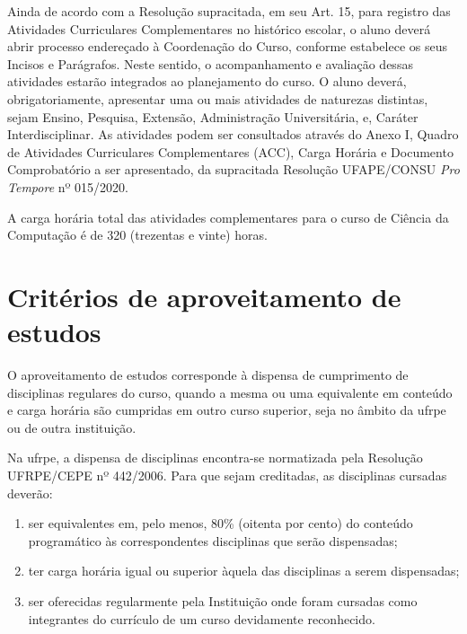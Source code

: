 \documentclass[
	12pt,				%
	openright,			%
  oneside,     %
	a4paper,			%
 hyphens,
	chapter=TITLE,		%
	english,			%
	french,				%
	spanish,			%
	brazil				%
	]{abntex2}
\begin{document}
Ainda de acordo com a Resolução supracitada, em seu Art. 15, para registro das Atividades Curriculares Complementares no histórico escolar, o aluno deverá abrir processo endereçado à Coordenação do Curso, conforme estabelece os seus Incisos e Parágrafos. Neste sentido, o acompanhamento e avaliação dessas atividades estarão integrados ao planejamento do curso. O aluno deverá, obrigatoriamente, apresentar uma ou mais atividades de naturezas distintas, sejam Ensino, Pesquisa, Extensão, Administração Universitária, e, Caráter Interdisciplinar. As atividades podem ser consultados através do Anexo I, Quadro de Atividades Curriculares Complementares (ACC), Carga Horária e Documento Comprobatório a ser apresentado, da supracitada Resolução UFAPE/CONSU \textit{Pro Tempore} nº 015/2020.

A carga horária total das atividades complementares para o curso de Ciência da Computação é de 320 (trezentas e vinte) horas.



%
%


\chapter{Critérios de aproveitamento de estudos}

O aproveitamento de estudos corresponde à dispensa de cumprimento de disciplinas regulares do curso, quando a mesma ou uma equivalente em conteúdo e carga horária são cumpridas em outro curso superior, seja no âmbito da \acrshort{ufrpe} ou de outra instituição.

Na \acrshort{ufrpe}, a dispensa de disciplinas encontra-se normatizada pela Resolução UFRPE/CEPE nº 442/2006. Para que sejam creditadas, as disciplinas cursadas deverão:

\begin{enumerate}[label=(\alph*)]
  \item ser equivalentes em, pelo menos, 80\% (oitenta por cento) do conteúdo programático às correspondentes disciplinas que serão dispensadas; 	
  \item ter carga horária igual ou superior àquela das disciplinas a serem dispensadas; 	
  \item ser oferecidas regularmente pela Instituição onde foram cursadas como integrantes do currículo de um curso devidamente reconhecido.
\end{enumerate}
\end{document}
